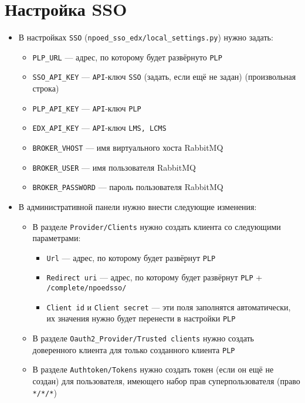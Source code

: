 \section{Настройка SSO}
\begin{itemize}
	\item В настройках \texttt{SSO} (\texttt{npoed\_sso\_edx/local\_settings.py}) нужно задать:
	\begin{itemize}
		\item \texttt{PLP\_URL} --- адрес, по которому будет развёрнуто \texttt{PLP}
		\item \texttt{SSO\_API\_KEY} --- \texttt{API}-ключ \texttt{SSO} (задать, если ещё не задан) (произвольная строка)
		\item \texttt{PLP\_API\_KEY} --- \texttt{API}-ключ \texttt{PLP}
		\item \texttt{EDX\_API\_KEY} --- \texttt{API}-ключ \texttt{LMS, LCMS}
		\item \texttt{BROKER\_VHOST} --- имя виртуального хоста RabbitMQ
		\item \texttt{BROKER\_USER} --- имя пользователя RabbitMQ
		\item \texttt{BROKER\_PASSWORD} --- пароль пользователя RabbitMQ
	\end{itemize}
	\item В административной панели нужно внести следующие изменения:
	\begin{itemize}
		\item В разделе \texttt{Provider/Clients} нужно создать клиента со следующими параметрами:
		\begin{itemize}
			\item \texttt{Url} --- адрес, по которому будет развёрнут \texttt{PLP}
			\item \texttt{Redirect uri} --- адрес, по которому будет развёрнут \texttt{PLP} + \texttt{/complete/npoedsso/}
			\item \texttt{Client id} и \texttt{Client secret} --- эти поля заполнятся автоматически,
				их значения нужно будет перенести в настройки \texttt{PLP}
		\end{itemize}
		\item В разделе \texttt{Oauth2\_Provider/Trusted clients} нужно создать доверенного клиента для только созданного клиента \texttt{PLP}
		\item В разделе \texttt{Authtoken/Tokens} нужно создать токен (если он ещё не создан) для пользователя, имеющего набор прав суперпользователя
			(право \texttt{*/*/*})
	\end{itemize}
\end{itemize}

